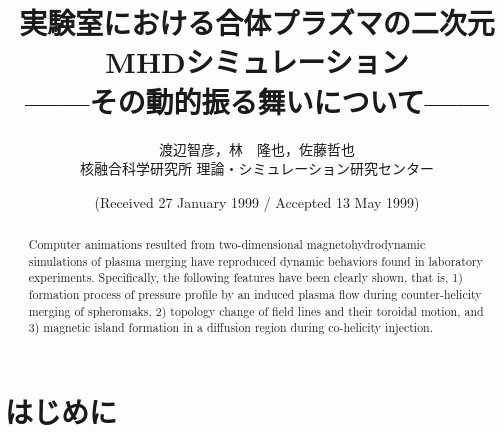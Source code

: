 \documentclass{jspf}            %
\begin{document}


\title{実験室における合体プラズマの二次元MHDシミュレーション \\
  ——その動的振る舞いについて——}


\author{渡辺智彦，林　隆也，佐藤哲也 \\
  核融合科学研究所 理論・シミュレーション研究センター}






\date{(Received 27 January 1999 / Accepted 13 May 1999)}


\begin{abstract}
  Computer animations resulted from
  two-dimensional magnetohydrodynamic simulations of plasma merging have
  reproduced dynamic behaviors found in laboratory experiments. Specifically,
  the following features have been clearly shown, that is, 1) formation process
  of pressure profile by an induced plasma flow during counter-helicity merging
  of spheromaks, 2) topology change of field lines and their toroidal motion,
  and 3) magnetic island formation in a diffusion region during co-helicity
  injection.
\end{abstract}






\section{はじめに}
\end{document}
